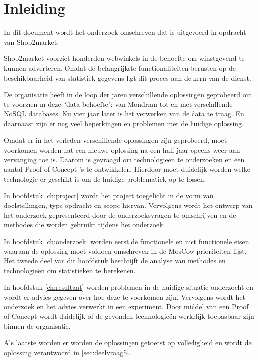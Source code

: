 \chapter{Inleiding}

In dit document wordt het onderzoek omschreven dat is uitgevoerd in opdracht van Shop2market.

Shop2market voorziet honderden webwinkels in de behoefte om winstgevend te kunnen adverteren. Omdat de belangrijkste functionaliteiten berusten op de beschikbaarheid van statistiek gegevens ligt dit proces aan de kern van de dienst.

De organisatie heeft in de loop der jaren verschillende oplossingen geprobeerd om te voorzien in deze ``data behoefte": van Mondrian tot en met verschillende NoSQL databases. Nu vier jaar later is het verwerken van de data te traag. En daarnaast zijn er nog veel beperkingen en problemen met de huidige oplossing.

Omdat er in het verleden verschillende oplossingen zijn geprobeerd, moet voorkomen worden dat een nieuwe oplossing na een half jaar opeens weer aan vervanging toe is. Daarom is gevraagd om technologieën te onderzoeken en een aantal Proof of Concept 's te ontwikkelen. Hierdoor moet duidelijk worden welke technologie er geschikt is om de huidige problematiek op te lossen.

In hoofdstuk \ref{ch:project} wordt het project toegelicht in de vorm van doelstellingen, type opdracht en scope hiervan. Vervolgens wordt het ontwerp van het onderzoek gepresenteerd door de onderzoeksvragen te omschrijven en de methodes die worden gebruikt tijdens het onderzoek.


In hoofdstuk \ref{ch:onderzoek} worden eerst de functionele en niet functionele eisen waaraan de oplossing moet voldoen omschreven in de MosCow prioriteiten lijst. Het tweede deel van dit hoofdstuk beschrijft de analyse van methodes en technologieën om statistieken te berekenen.


In hoofdstuk \ref{ch:resultaat} worden problemen in de huidige situatie onderzocht en wordt er advies gegeven over hoe deze te voorkomen zijn. Vervolgens wordt het onderzoek en het advies verwerkt in een experiment. Door middel van een Proof of Concept wordt duidelijk of de gevonden technologieën werkelijk toepasbaar zijn binnen de organisatie.

Als laatste worden er worden de oplossingen getoetst op volledigheid en wordt de oplossing verantwoord in \ref{sec:deelvraag5}.


